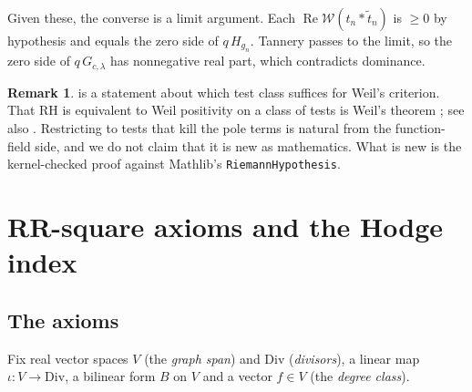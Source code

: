 \documentclass[11pt]{article}
\theoremstyle{definition}
\newtheorem{remark}[theorem]{Remark}
\newcommand{\lean}[1]{\texttt{#1}}
\newcommand{\re}{\operatorname{Re}}
\newcommand{\Div}{\mathrm{Div}}
\newcommand{\Weil}{\mathcal{W}}
\begin{document}
Given these, the converse is a limit argument. Each $\re\Weil(t_n * \tilde t_n)$ is $\ge 0$ by hypothesis and equals the zero side of $q\,H_{g_n}$. Tannery passes to the limit, so the zero side of $q\,G_{c,\lambda}$ has nonnegative real part, which contradicts dominance.

\begin{remark}
 is a statement about which test class suffices for Weil's criterion. That RH is equivalent to Weil positivity on a class of tests is Weil's theorem \cite{Weil52}; see also \cite{Bombieri}. Restricting to tests that kill the pole terms is natural from the function-field side, and we do not claim that it is new as mathematics. What is new is the kernel-checked proof against Mathlib's \lean{RiemannHypothesis}.
\end{remark}

\section{RR-square axioms and the Hodge index}\label{sec:axioms}

\subsection{The axioms}

Fix real vector spaces $V$ (the \emph{graph span}) and $\Div$ (\emph{divisors}), a linear map $\iota : V \to \Div$, a bilinear form $B$ on $V$ and a vector $f \in V$ (the \emph{degree class}).
\end{document}
